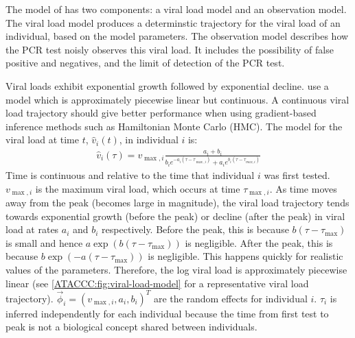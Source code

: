 \documentclass[thesis.tex]{subfiles}
\begin{document}
The model of \textcite{hakkiOnset} has two components: a viral load model and an observation model.
The viral load model produces a determinstic trajectory for the viral load of an individual, based on the model parameters.
The observation model describes how the PCR test noisly observes this viral load.
It includes the possibility of false positive and negatives, and the limit of detection of the PCR test.

Viral loads exhibit exponential growth followed by exponential decline.
\Textcite{hakkiOnset} use a model which is approximately piecewise linear but continuous.
A continuous viral load trajectory should give better performance when using gradient-based inference methods such as Hamiltonian Monte Carlo (HMC).
The model for the viral load at time $t$, $\hat{v}_i(t)$, in individual $i$ is:
\begin{align}
\hat{v}_i(\tau) = v_{\max,i} \frac{a_i+b_i}{b_ie^{-a_i(\tau-\tau_{\max,i})} + a_ie^{b_i(\tau-\tau_{max,i})}} \label{ATACCC:eq:viral-load}
\end{align}
Time is continuous and relative to the time that individual $i$ was first tested.
$v_{\max,i}$ is the maximum viral load, which occurs at time $\tau_{\max,i}$.
As time moves away from the peak (\ie becomes large in magnitude), the viral load trajectory tends towards exponential growth (before the peak) or decline (after the peak) in viral load at rates $a_i$ and $b_i$ respectively.
Before the peak, this is because $b(\tau-\tau_{\max})$ is small and hence $a\exp(b(\tau-\tau_{\max}))$ is negligible.
After the peak, this is because $b\exp(-a(\tau-\tau_{\max}))$ is negligible.
This happens quickly for realistic values of the parameters.
Therefore, the log viral load is approximately piecewise linear (see \cref{ATACCC:fig:viral-load-model} for a representative viral load trajectory).
$\vec{\phi}_i = (v_{\max,i}, a_i, b_i)^T$ are the random effects for individual $i$.
$\tau_i$ is inferred independently for each individual because the time from first test to peak is not a biological concept shared between individuals.
\end{document}
